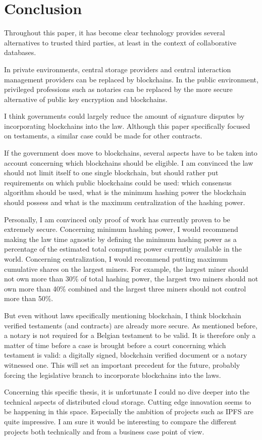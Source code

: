 \chapter{Conclusion}

Throughout this paper, it has become clear technology provides several alternatives to trusted third parties, at least in the context of collaborative databases. 

In  private environments, central storage providers and central interaction management providers can be replaced by blockchains. In the public environment, privileged professions such as notaries can be replaced by the more secure alternative of public key encryption and blockchains.

I think governments could largely reduce the amount of signature disputes by incorporating blockchains into the law. Although this paper specifically focused on testaments, a similar case could be made for other contracts. 

If the government does move to blockchains, several aspects have to be taken into account concerning which blockchains should be eligible. I am convinced the law should not limit itself to one single blockchain, but should rather put requirements on which public blockchains could be used: which consensus algorithm should be used, what is the minimum hashing power the blockchain should possess and what is the maximum centralization of the hashing power. 

Personally, I am convinced only proof of work has currently proven to be extremely secure. Concerning minimum hashing power, I would recommend making the law time agnostic by defining the minimum hashing power as a percentage of the estimated total computing power currently available in the world. Concerning centralization, I would recommend putting maximum cumulative shares on the largest miners. For example, the largest miner should not own more than 30\% of total hashing power, the largest two miners should not own more than 40\% combined and the largest three miners should not control more than 50\%. 

But even without laws specifically mentioning blockchain, I think blockchain verified testaments (and contracts) are already more secure. As mentioned before, a notary is not required for a Belgian testament to be valid. It is therefore only a matter of time before a case is brought before a court concerning which testament is valid: a digitally signed, blockchain verified document or a notary witnessed one. This will set an important precedent for the future, probably forcing the legislative branch to incorporate blockchains into the laws.


Concerning this specific thesis, it is unfortunate I could no dive deeper into the technical aspects of distributed cloud storage. Cutting edge innovation seems to be happening in this space. Especially the ambition of projects such as IPFS are quite impressive. I am sure it would be interesting to compare the different projects both technically and from a business case point of view.